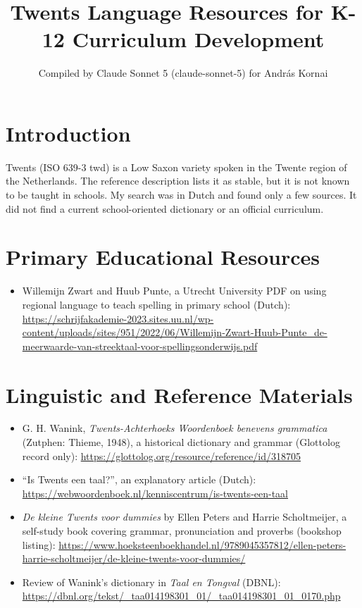 \documentclass[12pt]{article}
\title{Twents Language Resources for K-12 Curriculum Development}
\author{Compiled by Claude Sonnet 5 (claude-sonnet-5) for Andr\'as Kornai}
\date{}
\begin{document}
\maketitle

\section{Introduction}
Twents (ISO 639-3 twd) is a Low Saxon variety spoken in the Twente region of the Netherlands. The reference description lists it as stable, but it is not known to be taught in schools. My search was in Dutch and found only a few sources. It did not find a current school-oriented dictionary or an official curriculum.

\section{Primary Educational Resources}
\begin{itemize}
\item Willemijn Zwart and Huub Punte, a Utrecht University PDF on using regional language to teach spelling in primary school (Dutch): \url{https://schrijfakademie-2023.sites.uu.nl/wp-content/uploads/sites/951/2022/06/Willemijn-Zwart-Huub-Punte_de-meerwaarde-van-streektaal-voor-spellingsonderwijs.pdf}
\end{itemize}

\section{Linguistic and Reference Materials}
\begin{itemize}
\item G. H. Wanink, \emph{Twents-Achterhoeks Woordenboek benevens grammatica} (Zutphen: Thieme, 1948), a historical dictionary and grammar (Glottolog record only): \url{https://glottolog.org/resource/reference/id/318705}
\item ``Is Twents een taal?'', an explanatory article (Dutch): \url{https://webwoordenboek.nl/kenniscentrum/is-twents-een-taal}
\item \emph{De kleine Twents voor dummies} by Ellen Peters and Harrie Scholtmeijer, a self-study book covering grammar, pronunciation and proverbs (bookshop listing): \url{https://www.hoeksteenboekhandel.nl/9789045357812/ellen-peters-harrie-scholtmeijer/de-kleine-twents-voor-dummies/}
\item Review of Wanink's dictionary in \emph{Taal en Tongval} (DBNL): \url{https://dbnl.org/tekst/_taa014198301_01/_taa014198301_01_0170.php}
\end{itemize}
\end{document}

